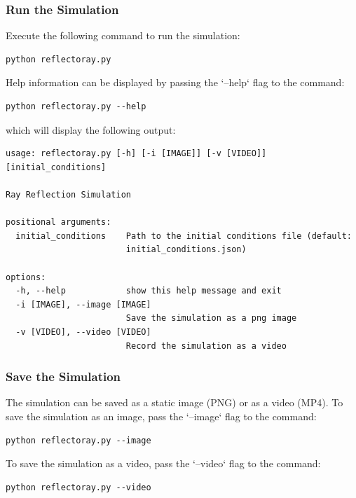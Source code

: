 \documentclass{article}
\begin{document}
\subsubsection{Run the Simulation}

Execute the following command to run the simulation:

\begin{verbatim}
python reflectoray.py
\end{verbatim}

Help information can be displayed by passing the `--help` flag to the command:

\begin{verbatim}
python reflectoray.py --help
\end{verbatim}

which will display the following output:

\begin{verbatim}
usage: reflectoray.py [-h] [-i [IMAGE]] [-v [VIDEO]] [initial_conditions]

Ray Reflection Simulation

positional arguments:
  initial_conditions    Path to the initial conditions file (default:
                        initial_conditions.json)

options:
  -h, --help            show this help message and exit
  -i [IMAGE], --image [IMAGE]
                        Save the simulation as a png image
  -v [VIDEO], --video [VIDEO]
                        Record the simulation as a video
\end{verbatim}

\subsubsection{Save the Simulation}

The simulation can be saved as a static image (PNG) or as a video (MP4). To save
the simulation as an image, pass the `--image` flag to the command:

\begin{verbatim}
python reflectoray.py --image
\end{verbatim}

To save the simulation as a video, pass the `--video` flag to the command:

\begin{verbatim}
python reflectoray.py --video
\end{verbatim}
\end{document}
